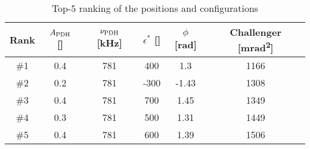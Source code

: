 \begin{table}
	\centering
	\begin{tabular}{|c|c|c|c|c|c|}
		\hline
		Rank & $A_{\text{PDH}}$ [\si{\voltptp}] & $\nu_{\text{PDH}}$ [\si{\kilo\hertz}] & $\epsilon^*$ [\si{\au}] & $\phi$ [\si{\radian}] & Challenger [\si{\milli\radian\squared}]\\
		\hline
		\hline
		\#1 & 0.4 & 781 & 400 & 1.3 & 1166\\
		\#2 & 0.2 & 781 & -300 & -1.43 & 1308\\
		\#3 & 0.4 & 781 & 700 & 1.45 & 1349\\
		\#4 & 0.3 & 781 & 500 & 1.31 & 1449\\
		\#5 & 0.4 & 781 & 600 & 1.39 & 1506\\
		\hline
	\end{tabular}
	\caption{Top-5 ranking of the positions and configurations}
	\label{ranking}
\end{table}





